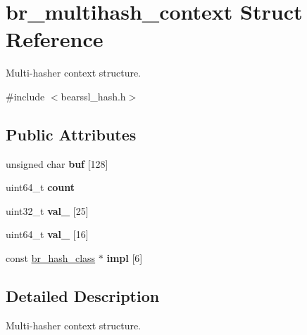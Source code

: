 \hypertarget{structbr__multihash__context}{}\section{br\+\_\+multihash\+\_\+context Struct Reference}
\label{structbr__multihash__context}


Multi-\/hasher context structure.  




{\ttfamily \#include $<$bearssl\+\_\+hash.\+h$>$}

\subsection*{Public Attributes}
\begin{DoxyCompactItemize}
\item 
\mbox{\label{structbr__multihash__context_a7c3e73fba08eb084b42dcc6e8c7d27e8}} 
unsigned char {\bfseries buf} \mbox{[}128\mbox{]}
\item 
\mbox{\label{structbr__multihash__context_ab006765daf9fa7e8bceba62579da9878}} 
uint64\+\_\+t {\bfseries count}
\item 
\mbox{\label{structbr__multihash__context_abf44ad4f1169dda14e16609cbecc5d9c}} 
uint32\+\_\+t {\bfseries val\+\_} \mbox{[}25\mbox{]}
\item 
\mbox{\label{structbr__multihash__context_a81009588ed9a32b512d3da1ca8d1cd6a}} 
uint64\+\_\+t {\bfseries val\+\_} \mbox{[}16\mbox{]}
\item 
\mbox{\label{structbr__multihash__context_a4818d658223b1f425b60015f43bb2fbb}} 
const \hyperlink{bearssl__hash_8h_ae38c1b9d539537cc16fc84388b922d86}{br\+\_\+hash\+\_\+class} $\ast$ {\bfseries impl} \mbox{[}6\mbox{]}
\end{DoxyCompactItemize}


\subsection{Detailed Description}
Multi-\/hasher context structure. 

